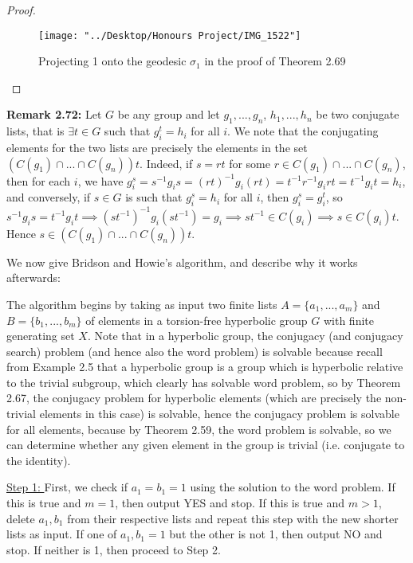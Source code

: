 \documentclass[12pt]{article}
\newcommand{\vs}{\vskip10pt}
\begin{document}
\begin{proof}
\begin{figure} [H]
	\centering
	\texttt{[image: "../Desktop/Honours Project/IMG\_1522"]}
	\caption{Projecting 1 onto the geodesic $\sigma_1$ in the proof of Theorem 2.69}
	\label{fig:img1522}
\end{figure}

		
		
	\end{proof}
	
	\textbf{Remark 2.72: } Let $G$ be any group and let $g_1,...,g_n$, $h_1,...,h_n$ be two conjugate lists, that is $\exists t \in G$ such that $g_i^t = h_i$ for all $i$. We note that the conjugating elements for the two lists are precisely the elements in the set $(C(g_1) \cap ... \cap C(g_n))t$. Indeed, if $s = rt$ for some $r \in C(g_1) \cap ... \cap C(g_n)$, then for each $i$, we have $g_i^s = s^{-1} g_i s = (rt)^{-1} g_i (rt) = t^{-1} r^{-1} g_i r t = t^{-1} g_i t = h_i$, and conversely, if $s \in G$ is such that $g_i^s = h_i$ for all $i$, then $g_i^s = g_i^t$, so $s^{-1} g_i s = t^{-1} g_i t \implies (st^{-1})^{-1} g_i (st^{-1}) = g_i \implies st^{-1} \in C(g_i) \implies s \in C(g_i)t$. Hence $s \in (C(g_1) \cap ... \cap C(g_n))t$. 
	
	\vs 
	
	We now give Bridson and Howie's algorithm, and describe why it works afterwards: 
	
	\vs 
	
	The algorithm begins by taking as input two finite lists $A = \{a_1,...,a_m\}$ and $B = \{b_1,...,b_m\}$ of elements in a torsion-free hyperbolic group $G$ with finite generating set $X$. Note that in a hyperbolic group, the conjugacy (and conjugacy search) problem (and hence also the word problem) is solvable because recall from Example 2.5 that a hyperbolic group is a group which is hyperbolic relative to the trivial subgroup, which clearly has solvable word problem, so by Theorem 2.67, the conjugacy problem for hyperbolic elements (which are precisely the non-trivial elements in this case) is solvable, hence the conjugacy problem is solvable for all elements, because by Theorem 2.59, the word problem is solvable, so we can determine whether any given element in the group is trivial (i.e. conjugate to the identity).  
	
	\vs 
	
	\underline{Step 1: } First, we check if $a_1 = b_1 = 1$ using the solution to the word problem. If this is true and $m = 1$, then output YES and stop. If this is true and $m > 1$, delete $a_1, b_1$ from their respective lists and repeat this step with the new shorter lists as input. If one of $a_1, b_1 = 1$ but the other is not 1, then output NO and stop. If neither is 1, then proceed to Step 2. 
	
\end{document}
